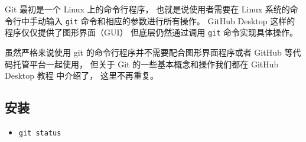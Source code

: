 
\begin{issues}
\issueDraft
\end{issues}


Git 最初是一个 Linux 上的命令行程序， 也就是说使用者需要在 Linux 系统的命令行中手动输入 \verb|git| 命令和相应的参数进行所有操作。 GitHub Desktop 这样的程序仅仅提供了图形界面（GUI） 但底层仍然通过调用 \verb|git| 命令实现具体操作。

虽然严格来说使用 git 的命令行程序并不需要配合图形界面程序或者 GitHub 等代码托管平台一起使用， 但关于 Git 的一些基本概念和操作我们都在 GitHub Desktop 教程 中介绍了， 这里不再重复。

\subsection{安装}

\begin{itemize}
\item \verb|git status|
\end{itemize}

